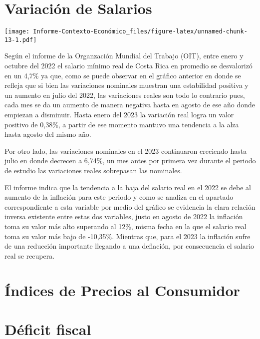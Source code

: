 \documentclass[
]{article}
\begin{document}
\hypertarget{variaciuxf3n-de-salarios}{%
\section{Variación de Salarios}\label{variaciuxf3n-de-salarios}}

\texttt{[image: Informe-Contexto-Económico\_files/figure-latex/unnamed-chunk-13-1.pdf]}

Según el informe de la Organzación Mundial del Trabajo (OIT), entre
enero y octubre del 2022 el salario mínimo real de Costa Rica en
promedio se desvalorizó en un 4,7\% ya que, como se puede observar en el
gráfico anterior en donde se refleja que si bien las variaciones
nominales muestran una estabilidad positiva y un aumento en julio del
2022, las variaciones reales son todo lo contrario pues, cada mes se da
un aumento de manera negativa hasta en agosto de ese año donde empiezan
a disminuir. Hasta enero del 2023 la variación real logra un valor
positivo de 0,38\%, a partir de ese momento mantuvo una tendencia a la
alza hasta agosto del mismo año.

Por otro lado, las variaciones nominales en el 2023 continuaron
creciendo hasta julio en donde decrecen a 6,74\%, un mes antes por
primera vez durante el periodo de estudio las variaciones reales
sobrepasan las nominales.

El informe indica que la tendencia a la baja del salario real en el 2022
se debe al aumento de la inflación para este periodo y como se analiza
en el apartado correspondiente a esta variable por medio del gráfico se
evidencia la clara relación inversa existente entre estas dos variables,
justo en agosto de 2022 la inflación toma su valor más alto superando al
12\%, misma fecha en la que el salario real toma su valor más bajo de
-10,35\%. Mientras que, para el 2023 la inflación sufre de una reducción
importante llegando a una deflación, por consecuencia el salario real se
recupera.

\hypertarget{uxedndices-de-precios-al-consumidor}{%
\section{Índices de Precios al
Consumidor}\label{uxedndices-de-precios-al-consumidor}}

\hypertarget{duxe9ficit-fiscal}{%
\section{Déficit fiscal}\label{duxe9ficit-fiscal}}
\end{document}
